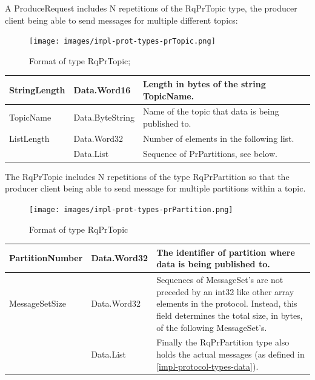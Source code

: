 A ProduceRequest includes N repetitions of the RqPrTopic type, the producer
client being able to send messages for multiple different topics:

\begin{figure}[H]
    \centering
    \texttt{[image: images/impl-prot-types-prTopic.png]}
    \caption{Format of type RqPrTopic;}
    \label{fig:impl-prot-types-produceRequest}
\end{figure}

\begin{table}[H]
\centering
\begin{tabular}{ l  l  p{8cm} }
\hline
StringLength      & Data.Word16     & Length in bytes of the string TopicName.              \\ \hline
TopicName         & Data.ByteString & Name of the topic that data is being published to. \\ \hline
ListLength        & Data.Word32     & Number of elements in the following list.                \\ \hline
[RqPrPartition] & Data.List          & Sequence of PrPartitions, see below.                \\ \hline
\end{tabular}
\end{table}

The RqPrTopic includes N repetitions of the type RqPrPartition so that
the producer client being able to send message for multiple partitions
within a topic.  

\begin{figure}[H]
    \centering
    \texttt{[image: images/impl-prot-types-prPartition.png]}
    \caption{Format of type RqPrTopic}
    \label{fig:impl-prot-types-produceRequest}
\end{figure}

\begin{table}[H]
\centering
\begin{tabular}{ l  l  p{8cm} }
\hline
PartitionNumber & Data.Word32 & The identifier of  partition where data is being published to.                                                                                                                                        \\ \hline
MessageSetSize  & Data.Word32 & Sequences of MessageSet's are not preceded by an int32 like other array elements in the protocol. Instead, this field determines the total size, in bytes, of the following MessageSet's. \\ \hline
[MessageSet]      & Data.List      & Finally the RqPrPartition type also holds
the actual messages (as defined in \ref{impl-protocol-types-data}).                                                                                \\ \hline
\end{tabular}
\end{table}

